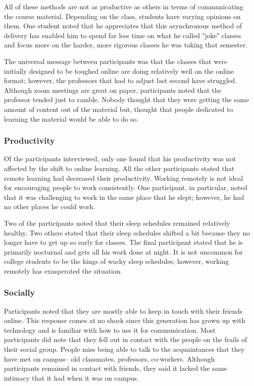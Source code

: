 \documentclass[12pt,
 reprint,
nofootinbib,
 amsmath,amssymb,
 aps,
floatfix,
]{revtex4-2}
\begin{document}
All of these methods are not as productive as others in terms of communicating the course material. Depending on the class, students have varying opinions on them. One student noted that he appreciates that this asynchronous method of delivery has enabled him to spend far less time on what he called "joke" classes and focus more on the harder, more rigorous classes he was taking that semester.

The universal message between participants was that the classes that were initially designed to be toughed online are doing relatively well on the online format; however, the professors that had to adjust last second have struggled. Although zoom meetings are great on paper, participants noted that the professor tended just to ramble. Nobody thought that they were getting the same amount of content out of the material but, thought that people dedicated to learning the material would be able to do so. 

\subsubsection{Productivity}

Of the participants interviewed, only one found that his productivity was not affected by the shift to online learning. All the other participants stated that remote learning had decreased their productivity. Working remotely is not ideal for encouraging people to work consistently. One participant, in particular, noted that it was challenging to work in the same place that he slept; however, he had no other places he could work.

Two of the participants noted that their sleep schedules remained relatively healthy. Two others stated that their sleep schedules shifted a bit because they no longer have to get up so early for classes. The final participant stated that he is primarily nocturnal and gets all his work done at night. It is not uncommon for college students to be the kings of wacky sleep schedules; however, working remotely has exasperated the situation. 

\subsubsection{Socially}

Participants noted that they are mostly able to keep in touch with their friends online. This response comes at no shock since this generation has grown up with technology and is familiar with how to use it for communication. Most participants did note that they fell out in contact with the people on the frails of their social group. People miss being able to talk to the acquaintances that they have met on campus-- old classmates, professors, co-workers. Although participants remained in contact with friends, they said it lacked the same intimacy that it had when it was on campus. 
\end{document}
